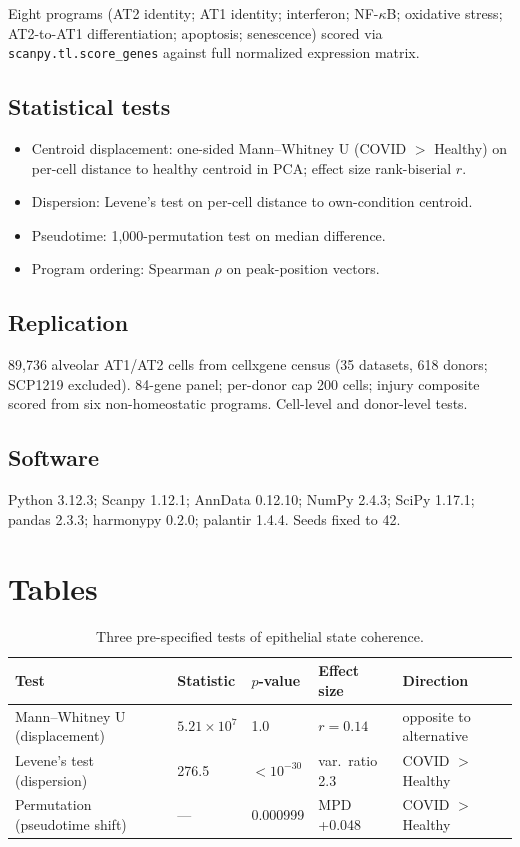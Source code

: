 \documentclass[11pt,a4paper]{article}
\begin{document}
Eight programs (AT2 identity; AT1 identity; interferon; NF-$\kappa$B; oxidative
stress; AT2-to-AT1 differentiation; apoptosis; senescence) scored via
\texttt{scanpy.tl.score\_genes} against full normalized expression matrix.

\subsection{Statistical tests}

\begin{itemize}
\item Centroid displacement: one-sided Mann--Whitney U (COVID $>$ Healthy) on per-cell distance to healthy centroid in PCA; effect size rank-biserial $r$.
\item Dispersion: Levene's test on per-cell distance to own-condition centroid.
\item Pseudotime: 1,000-permutation test on median difference.
\item Program ordering: Spearman $\rho$ on peak-position vectors.
\end{itemize}

\subsection{Replication}

89,736 alveolar AT1/AT2 cells from cellxgene census (35 datasets, 618 donors;
SCP1219 excluded). 84-gene panel; per-donor cap 200 cells; injury composite
scored from six non-homeostatic programs. Cell-level and donor-level tests.

\subsection{Software}

Python 3.12.3; Scanpy 1.12.1; AnnData 0.12.10; NumPy 2.4.3; SciPy 1.17.1;
pandas 2.3.3; harmonypy 0.2.0; palantir 1.4.4. Seeds fixed to 42.

\section{Tables}

\begin{table}[htbp]
\centering
\caption{Three pre-specified tests of epithelial state coherence.}
\label{tab:three-tests}
\begin{tabular}{lllll}
\toprule
Test & Statistic & $p$-value & Effect size & Direction \\
\midrule
Mann--Whitney U (displacement) & $5.21 \times 10^7$ & 1.0 & $r = 0.14$ & opposite to alternative \\
Levene's test (dispersion) & 276.5 & $< 10^{-30}$ & var.\ ratio 2.3 & COVID $>$ Healthy \\
Permutation (pseudotime shift) & --- & 0.000999 & MPD +0.048 & COVID $>$ Healthy \\
\bottomrule
\end{tabular}
\end{table}
\end{document}
